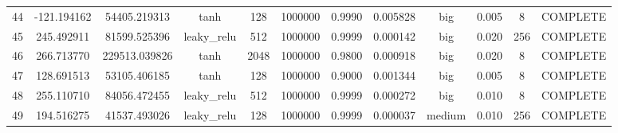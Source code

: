 \begin{longtable}{cccccccccccc}
                       44 &                -121.194162 &                       54405.219313 &            tanh &         128 &      1000000 & 0.9990 &       0.005828 &       big & 0.005 &           8 & COMPLETE \\
                       45 &                 245.492911 &                       81599.525396 &     leaky\_relu &         512 &      1000000 & 0.9999 &       0.000142 &       big & 0.020 &         256 & COMPLETE \\
                       46 &                 266.713770 &                      229513.039826 &            tanh &        2048 &      1000000 & 0.9800 &       0.000918 &       big & 0.020 &           8 & COMPLETE \\
                       47 &                 128.691513 &                       53105.406185 &            tanh &         128 &      1000000 & 0.9000 &       0.001344 &       big & 0.005 &           8 & COMPLETE \\
                       48 &                 255.110710 &                       84056.472455 &     leaky\_relu &         512 &      1000000 & 0.9999 &       0.000272 &       big & 0.010 &           8 & COMPLETE \\
                       49 &                 194.516275 &                       41537.493026 &     leaky\_relu &         128 &      1000000 & 0.9999 &       0.000037 &    medium & 0.010 &         256 & COMPLETE \\
\end{longtable}
